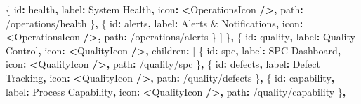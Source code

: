 \documentclass[
]{article}
\newenvironment{Shaded}{\begin{snugshade}}{\end{snugshade}}
\newcommand{\NormalTok}[1]{#1}
\newcommand{\OperatorTok}[1]{\textcolor[rgb]{0.81,0.36,0.00}{\textbf{#1}}}
\newcommand{\StringTok}[1]{\textcolor[rgb]{0.31,0.60,0.02}{#1}}
\begin{document}
\begin{Shaded}
\begin{Highlighting}[]
\NormalTok{      \{ id}\OperatorTok{:} \StringTok{\textquotesingle{}health\textquotesingle{}}\OperatorTok{,}\NormalTok{ label}\OperatorTok{:} \StringTok{\textquotesingle{}System Health\textquotesingle{}}\OperatorTok{,}\NormalTok{ icon}\OperatorTok{:} \OperatorTok{\textless{}}\NormalTok{OperationsIcon }\OperatorTok{/\textgreater{},}\NormalTok{ path}\OperatorTok{:} \StringTok{\textquotesingle{}/operations/health\textquotesingle{}}\NormalTok{ \}}\OperatorTok{,}
\NormalTok{      \{ id}\OperatorTok{:} \StringTok{\textquotesingle{}alerts\textquotesingle{}}\OperatorTok{,}\NormalTok{ label}\OperatorTok{:} \StringTok{\textquotesingle{}Alerts \& Notifications\textquotesingle{}}\OperatorTok{,}\NormalTok{ icon}\OperatorTok{:} \OperatorTok{\textless{}}\NormalTok{OperationsIcon }\OperatorTok{/\textgreater{},}\NormalTok{ path}\OperatorTok{:} \StringTok{\textquotesingle{}/operations/alerts\textquotesingle{}}\NormalTok{ \}}
\NormalTok{    ]}
\NormalTok{  \}}\OperatorTok{,}
\NormalTok{  \{}
\NormalTok{    id}\OperatorTok{:} \StringTok{\textquotesingle{}quality\textquotesingle{}}\OperatorTok{,}
\NormalTok{    label}\OperatorTok{:} \StringTok{\textquotesingle{}Quality Control\textquotesingle{}}\OperatorTok{,}
\NormalTok{    icon}\OperatorTok{:} \OperatorTok{\textless{}}\NormalTok{QualityIcon }\OperatorTok{/\textgreater{},}
\NormalTok{    children}\OperatorTok{:}\NormalTok{ [}
\NormalTok{      \{ id}\OperatorTok{:} \StringTok{\textquotesingle{}spc\textquotesingle{}}\OperatorTok{,}\NormalTok{ label}\OperatorTok{:} \StringTok{\textquotesingle{}SPC Dashboard\textquotesingle{}}\OperatorTok{,}\NormalTok{ icon}\OperatorTok{:} \OperatorTok{\textless{}}\NormalTok{QualityIcon }\OperatorTok{/\textgreater{},}\NormalTok{ path}\OperatorTok{:} \StringTok{\textquotesingle{}/quality/spc\textquotesingle{}}\NormalTok{ \}}\OperatorTok{,}
\NormalTok{      \{ id}\OperatorTok{:} \StringTok{\textquotesingle{}defects\textquotesingle{}}\OperatorTok{,}\NormalTok{ label}\OperatorTok{:} \StringTok{\textquotesingle{}Defect Tracking\textquotesingle{}}\OperatorTok{,}\NormalTok{ icon}\OperatorTok{:} \OperatorTok{\textless{}}\NormalTok{QualityIcon }\OperatorTok{/\textgreater{},}\NormalTok{ path}\OperatorTok{:} \StringTok{\textquotesingle{}/quality/defects\textquotesingle{}}\NormalTok{ \}}\OperatorTok{,}
\NormalTok{      \{ id}\OperatorTok{:} \StringTok{\textquotesingle{}capability\textquotesingle{}}\OperatorTok{,}\NormalTok{ label}\OperatorTok{:} \StringTok{\textquotesingle{}Process Capability\textquotesingle{}}\OperatorTok{,}\NormalTok{ icon}\OperatorTok{:} \OperatorTok{\textless{}}\NormalTok{QualityIcon }\OperatorTok{/\textgreater{},}\NormalTok{ path}\OperatorTok{:} \StringTok{\textquotesingle{}/quality/capability\textquotesingle{}}\NormalTok{ \}}\OperatorTok{,}

\end{Highlighting}
\end{Shaded}
\end{document}
